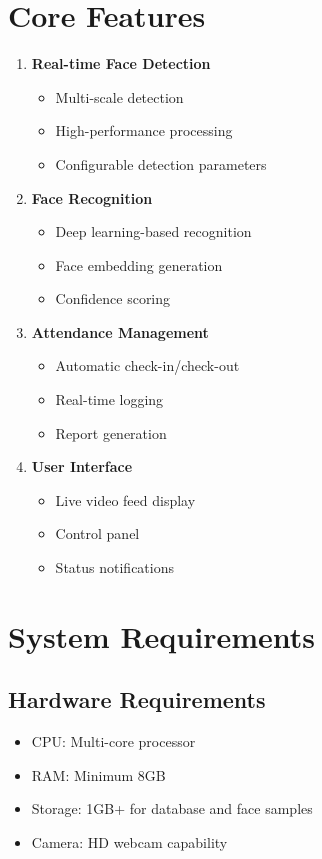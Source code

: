 \section{Core Features}
\begin{enumerate}
    \item \textbf{Real-time Face Detection}
    \begin{itemize}
        \item Multi-scale detection
        \item High-performance processing
        \item Configurable detection parameters
    \end{itemize}
    
    \item \textbf{Face Recognition}
    \begin{itemize}
        \item Deep learning-based recognition
        \item Face embedding generation
        \item Confidence scoring
    \end{itemize}
    
    \item \textbf{Attendance Management}
    \begin{itemize}
        \item Automatic check-in/check-out
        \item Real-time logging
        \item Report generation
    \end{itemize}
    
    \item \textbf{User Interface}
    \begin{itemize}
        \item Live video feed display
        \item Control panel
        \item Status notifications
    \end{itemize}
\end{enumerate}

\section{System Requirements}

\subsection{Hardware Requirements}
\begin{itemize}
    \item CPU: Multi-core processor
    \item RAM: Minimum 8GB
    \item Storage: 1GB+ for database and face samples
    \item Camera: HD webcam capability
\end{itemize}

